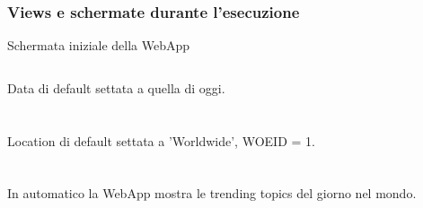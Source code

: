 \documentclass[xcolor=svgnames, aspectratio=169]{beamer}
\begin{document}
\subsubsection{Views e schermate durante l'esecuzione}

\begin{frame}{Schermata iniziale della WebApp}
    \begin{columns}[t]
        Data di default settata a quella di oggi.\\~\\~\\
        
        Location di default settata a 'Worldwide', WOEID = 1.\\~\\~\\
        
        In automatico la WebApp mostra le trending topics del giorno nel mondo.
        

\end{columns}
\end{frame}
\end{document}
